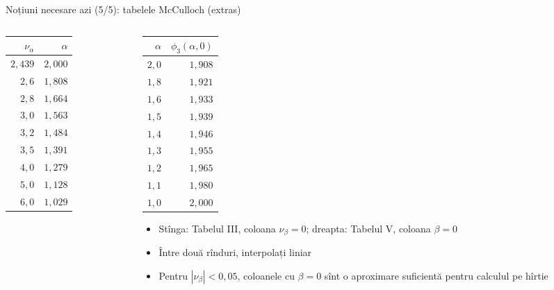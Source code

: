 \begin{frame}{Noțiuni necesare azi (5/5): tabelele McCulloch (extras)}
\itemsize{\footnotesize}
\begin{columns}[T]
\begin{column}{0.40\textwidth}
\begin{center}
\footnotesize
\begin{tabular}{rr}
\toprule
$\nu_\alpha$ & $\alpha$ \\
\midrule
$2{,}439$ & $2{,}000$ \\
$2{,}6$ & $1{,}808$ \\
$2{,}8$ & $1{,}664$ \\
$3{,}0$ & $1{,}563$ \\
$3{,}2$ & $1{,}484$ \\
$3{,}5$ & $1{,}391$ \\
$4{,}0$ & $1{,}279$ \\
$5{,}0$ & $1{,}128$ \\
$6{,}0$ & $1{,}029$ \\
\bottomrule
\end{tabular}
\end{center}

\end{column}
\begin{column}{0.56\textwidth}
\begin{center}
\footnotesize
\begin{tabular}{rr}
\toprule
$\alpha$ & $\phi_3(\alpha, 0)$ \\
\midrule
$2{,}0$ & $1{,}908$ \\
$1{,}8$ & $1{,}921$ \\
$1{,}6$ & $1{,}933$ \\
$1{,}5$ & $1{,}939$ \\
$1{,}4$ & $1{,}946$ \\
$1{,}3$ & $1{,}955$ \\
$1{,}2$ & $1{,}965$ \\
$1{,}1$ & $1{,}980$ \\
$1{,}0$ & $2{,}000$ \\
\bottomrule
\end{tabular}
\end{center}
\begin{itemize}
    \item Stînga: Tabelul III, coloana $\nu_\beta = 0$; dreapta: Tabelul V, coloana $\beta = 0$ 
    \item Între două rînduri, interpolați liniar
    \item Pentru $|\nu_\beta| < 0{,}05$, coloanele cu $\beta = 0$ sînt o aproximare suficientă pentru calculul pe hîrtie
\end{itemize}
\end{column}
\end{columns}
\end{frame}


